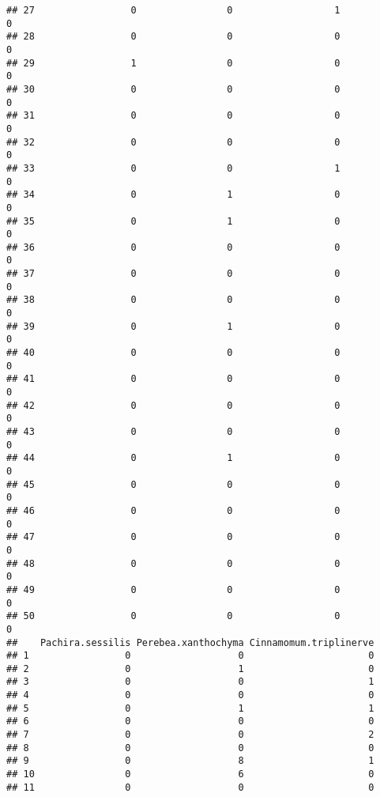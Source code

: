 \documentclass[
]{article}
\begin{document}
\begin{verbatim}
## 27                 0                0                  1               0
## 28                 0                0                  0               0
## 29                 1                0                  0               0
## 30                 0                0                  0               0
## 31                 0                0                  0               0
## 32                 0                0                  0               0
## 33                 0                0                  1               0
## 34                 0                1                  0               0
## 35                 0                1                  0               0
## 36                 0                0                  0               0
## 37                 0                0                  0               0
## 38                 0                0                  0               0
## 39                 0                1                  0               0
## 40                 0                0                  0               0
## 41                 0                0                  0               0
## 42                 0                0                  0               0
## 43                 0                0                  0               0
## 44                 0                1                  0               0
## 45                 0                0                  0               0
## 46                 0                0                  0               0
## 47                 0                0                  0               0
## 48                 0                0                  0               0
## 49                 0                0                  0               0
## 50                 0                0                  0               0
##    Pachira.sessilis Perebea.xanthochyma Cinnamomum.triplinerve
## 1                 0                   0                      0
## 2                 0                   1                      0
## 3                 0                   0                      1
## 4                 0                   0                      0
## 5                 0                   1                      1
## 6                 0                   0                      0
## 7                 0                   0                      2
## 8                 0                   0                      0
## 9                 0                   8                      1
## 10                0                   6                      0
## 11                0                   0                      0

\end{verbatim}
\end{document}
